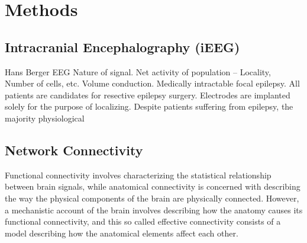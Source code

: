 %
%
\section*{Methods}

\subsection*{Intracranial Encephalography (iEEG)}
Hans Berger EEG
Nature of signal. Net activity of population – Locality, Number of cells, etc. Volume conduction. 
Medically intractable focal epilepsy. All patients are candidates for resective epilepsy surgery. Electrodes are implanted solely for the purpose of localizing.
Despite patients suffering from epilepsy, the majority physiological  

\subsection*{Network Connectivity}
Functional connectivity involves characterizing the statistical relationship between brain signals, while anatomical connectivity is concerned with describing the way the physical components of the brain are physically connected. However, a mechanistic account of the brain involves describing how the anatomy causes its functional connectivity, and this so called effective connectivity consists of a model describing how the anatomical elements affect each other.

